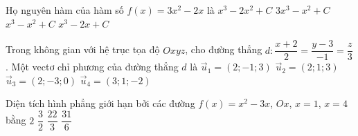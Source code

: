 \begin{ex}%
	Họ nguyên hàm của hàm số $f(x)=3x^2-2x$ là
	\choice
	{$x^3-2x^2+C$}
	{$3x^3-x^2+C$}
	{\True $x^3-x^2+C$}
	{$x^3-2x+C$}
\end{ex}

\begin{ex}%
	Trong không gian với hệ trục tọa độ $Oxyz$, cho đường thẳng $d\colon\dfrac{x+2}{2}=\dfrac{y-3}{-1}=\dfrac{z}{3}$. Một vectơ chỉ phương của đường thẳng $d$ là
	\choice
	{\True $\overrightarrow{u}_1=(2;-1;3)$}
	{$\overrightarrow{u}_2=(2;1;3)$}
	{$\overrightarrow{u}_3=(2;-3;0)$}
	{$\overrightarrow{u}_4=(3;1;-2)$}
\end{ex}

\begin{ex}%
	Diện tích hình phẳng giới hạn bởi các đường $f(x)=x^2-3x$, $Ox$, $x=1$, $x=4$ bằng
	\choice
	{$2$}
	{$\dfrac{3}{2}$}
	{$\dfrac{22}{3}$}
	{\True $\dfrac{31}{6}$}
\end{ex}

